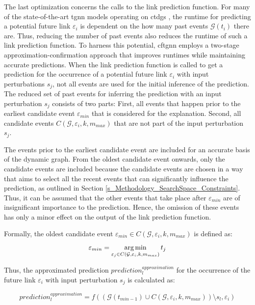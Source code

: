 The last optimization concerns the calls to the link prediction function. For many of the state-of-the-art \gls{tgnn} models operating on \glspl{ctdg} \cite{rossi_temporal_2020, souza_provably_2022}, the runtime for predicting a potential future link $\varepsilon_i$ is dependent on the how many past events $\mathcal{G}(t_i)$ there are. Thus, reducing the number of past events also reduces the runtime of such a link prediction function. To harness this potential, \gls{cftgnn} employs a two-stage approximation-confirmation approach that improves runtimes while maintaining accurate predictions. When the link prediction function is called to get a prediction for the occurrence of a potential future link $\varepsilon_i$ with input perturbations $s_j$, not all events are used for the initial inference of the prediction. The reduced set of past events for inferring the prediction with an input perturbation $s_j$ consists of two parts: First, all events that happen prior to the earliest candidate event $\varepsilon_{min}$ that is considered for the explanation. Second, all candidate events $C(\mathcal{G}, \varepsilon_i, k, m_{max})$ that are not part of the input perturbation $s_j$.

The events prior to the earliest candidate event are included for an accurate basis of the dynamic graph. From the oldest candidate event onwards, only the candidate events are included because the candidate events are chosen in a way that aims to select all the recent events that can significantly influence the prediction, as outlined in Section \ref{s_Methodology_SearchSpace_Constraints}. Thus, it can be assumed that the other events that take place after $\varepsilon_{min}$ are of insignificant importance to the prediction. Hence, the omission of these events has only a minor effect on the output of the link prediction function.

Formally, the oldest candidate event $\varepsilon_{min} \in C(\mathcal{G}, \varepsilon_i, k, m_{max})$ is defined as:

\begin{equation}
    \varepsilon_{min} = \operatorname*{arg\,min}_{\varepsilon_j \in C(\mathcal{G}, \varepsilon_i, k, m_{max})} t_j
\end{equation}

Thus, the approximated prediction $prediction_l^{approximation}$ for the occurrence of the future link $\varepsilon_i$ with input perturbation $s_j$ is calculated as: 

\begin{equation}
    prediction_l^{approximation} = f((\mathcal{G}(t_{min - 1}) \cup C(\mathcal{G}, \varepsilon_i, k, m_{max})) \setminus s_l, \varepsilon_i)
\end{equation}

